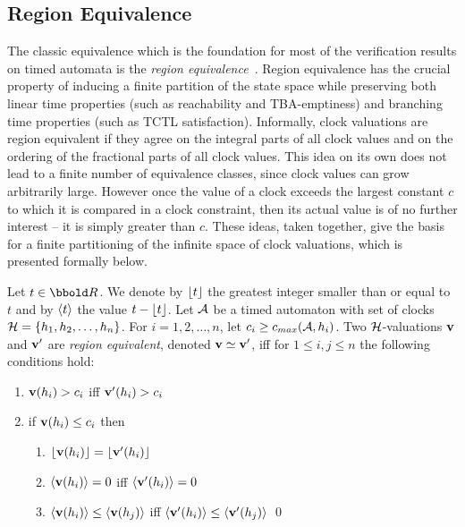 {\subsection{Region Equivalence}
The classic equivalence which is the foundation for most of the
verification results on timed automata is the \emph{region
equivalence}~\cite{ad:90,alu:91,acd:93,ad:94}.  Region equivalence has
the crucial property of inducing a finite partition of the state space
while preserving both linear time properties (such as reachability and
TBA-emptiness) and branching time properties (such as TCTL
satisfaction). Informally, clock valuations are region equivalent if
they agree on the integral parts of all clock values and on the
ordering of the fractional parts of all clock values. This idea on its
own does not lead to a finite number of equivalence classes, since
clock values can grow arbitrarily large. However once the value of a
clock exceeds the largest constant $c$ to which it is compared in a
clock constraint, then its actual value is of no further interest --
it is simply greater than $c$. These ideas, taken together, give the
basis for a finite partitioning of the infinite space of clock
valuations, which is presented formally below.

\begin{definition}
Let $t \in \Time$. We denote by $\lfloor t \rfloor$ the greatest integer
smaller than or equal to $t$ and by $\langle t \rangle$ the value $t -
\lfloor t \rfloor$. Let $\AA$ be a timed automaton with set of clocks $\clocks
= \{\clock_1,\clock_2,\ldots,\clock_n\}$.  For $i = 1,2,\ldots,n$, let
$c_i \geq \cmax(\AA,\clock_i)$. Two $\clocks$-valuations $\mathbf{v}$ and
$\mathbf{v}'$ are \emph{region equivalent}, denoted $\mathbf{v} \simeq
\mathbf{v}'$, iff for $1 \leq i,j \leq n$ the following
conditions hold:
\begin{enumerate}
\item $\mathbf{v}(h_i) > c_i$ iff $\mathbf{v}'(h_i) > c_i$
\item if $\mathbf{v}(h_i) \leq c_i$ then
\begin{enumerate}
\item $\lfloor \mathbf{v}(h_i) \rfloor = \lfloor \mathbf{v}'(h_i) \rfloor$
\item $\langle \mathbf{v}(h_i) \rangle = 0$ iff $\langle \mathbf{v}'(h_i) \rangle = 0$ 
\item $\langle \mathbf{v}(h_i) \rangle \leq \langle \mathbf{v}(h_j) \rangle$ iff 
      $\langle \mathbf{v}'(h_i) \rangle \leq \langle \mathbf{v}'(h_j) \rangle$
\qed
\end{enumerate}
\end{enumerate}
\end{definition}

}
